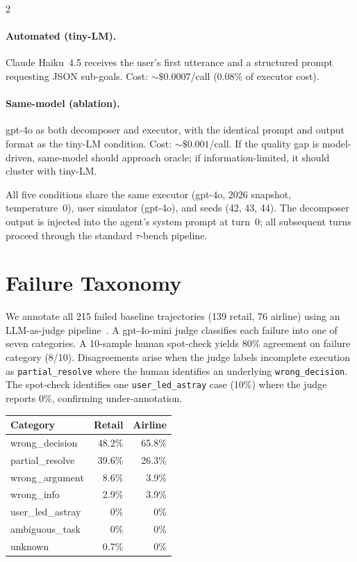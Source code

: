 \documentclass[11pt,a4paper]{article}
\begin{document}
\begin{multicols}{2}
\paragraph{Automated (tiny-LM).} Claude Haiku~4.5 receives the user's first utterance and a structured prompt requesting JSON sub-goals. Cost: ${\sim}\$0.0007$/call (0.08\% of executor cost).

\paragraph{Same-model (ablation).} gpt-4o as both decomposer and executor, with the identical prompt and output format as the tiny-LM condition. Cost: ${\sim}\$0.001$/call. If the quality gap is model-driven, same-model should approach oracle; if information-limited, it should cluster with tiny-LM.

All five conditions share the same executor (gpt-4o, 2026 snapshot, temperature~0), user simulator (gpt-4o), and seeds (42, 43, 44). The decomposer output is injected into the agent's system prompt at turn~0; all subsequent turns proceed through the standard $\tau$-bench pipeline.


\section{Failure Taxonomy}\label{sec:taxonomy}

We annotate all 215 failed baseline trajectories (139 retail, 76 airline) using an LLM-as-judge pipeline~\citep{zheng2023judging}. A gpt-4o-mini judge classifies each failure into one of seven categories. A 10-sample human spot-check yields 80\% agreement on failure category (8/10). Disagreements arise when the judge labels incomplete execution as \texttt{partial\_resolve} where the human identifies an underlying \texttt{wrong\_decision}. The spot-check identifies one \texttt{user\_led\_astray} case (10\%) where the judge reports 0\%, confirming under-annotation.

\begin{center}
\small
{}
\label{tab:taxonomy}
\begin{tabular}{lrr}
\toprule
Category & Retail & Airline \\
\midrule
wrong\_decision & 48.2\% & 65.8\% \\
partial\_resolve & 39.6\% & 26.3\% \\
wrong\_argument & 8.6\% & 3.9\% \\
wrong\_info & 2.9\% & 3.9\% \\
user\_led\_astray & 0\% & 0\% \\
ambiguous\_task & 0\% & 0\% \\
unknown & 0.7\% & 0\% \\
\bottomrule
\end{tabular}
\end{center}


\end{multicols}
\end{document}
